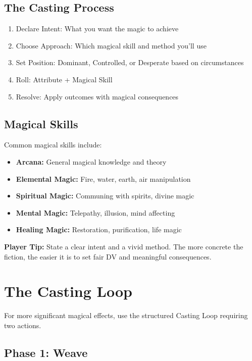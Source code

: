 \documentclass[11pt,twoside,openany]{book}
\begin{document}
\subsection*{The Casting Process}

\begin{enumerate}
\item Declare Intent: What you want the magic to achieve
\item Choose Approach: Which magical skill and method you'll use
\item Set Position: Dominant, Controlled, or Desperate based on circumstances
\item Roll: Attribute + Magical Skill
\item Resolve: Apply outcomes with magical consequences
\end{enumerate}

\subsection*{Magical Skills}

Common magical skills include:
\begin{itemize}
\item \textbf{Arcana:} General magical knowledge and theory
\item \textbf{Elemental Magic:} Fire, water, earth, air manipulation
\item \textbf{Spiritual Magic:} Communing with spirits, divine magic
\item \textbf{Mental Magic:} Telepathy, illusion, mind affecting
\item \textbf{Healing Magic:} Restoration, purification, life magic
\end{itemize}

\textbf{Player Tip:} State a clear intent and a vivid method. The more concrete the fiction, the easier it is to set fair DV and meaningful consequences.

\section*{The Casting Loop} 

For more significant magical effects, use the structured Casting Loop requiring two actions.

\subsection*{Phase 1: Weave}
\end{document}
